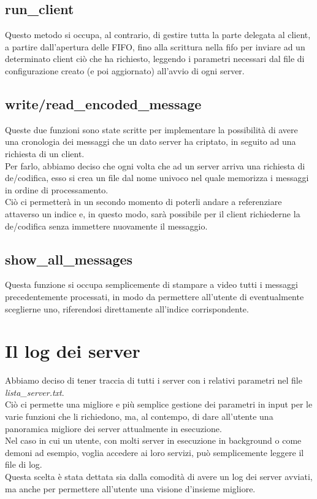 \documentclass[a4paper,9pt]{article}
\begin{document}
\subsection{run\_client}
Questo metodo si occupa, al contrario, di gestire tutta la parte delegata al client, a partire dall'apertura delle FIFO, fino alla scrittura nella fifo per inviare ad un determinato client ciò che ha richiesto, leggendo i parametri necessari dal file di configurazione creato (e poi aggiornato) all'avvio di ogni server.
\subsection{write/read\_encoded\_message}
Queste due funzioni sono state scritte per implementare la possibilità di avere una cronologia dei messaggi che un dato server ha criptato, in seguito ad una richiesta di un client.\\
Per farlo, abbiamo deciso che ogni volta che ad un server arriva una richiesta di de/codifica, esso si crea un file dal nome univoco nel quale memorizza i messaggi in ordine di processamento.\\
Ciò ci permetterà in un secondo momento di poterli andare a referenziare attaverso un indice e, in questo modo, sarà possibile per il client richiederne la de/codifica senza immettere nuovamente il messaggio.
\subsection{show\_all\_messages}
Questa funzione si occupa semplicemente di stampare a video tutti i messaggi precedentemente processati, in modo da permettere all'utente di eventualmente sceglierne uno, riferendosi direttamente all'indice corrispondente. 

\section{Il log dei server}
Abbiamo deciso di tener traccia di tutti i server con i relativi parametri nel file \emph{lista\_server.txt}.\\ 
Ciò ci permette una migliore e più semplice gestione dei parametri in input per le varie funzioni che li richiedono, ma, al contempo, di dare all'utente una panoramica migliore dei server attualmente in esecuzione.\\
Nel caso in cui un utente, con molti server in esecuzione in background o come demoni ad esempio, voglia accedere ai loro servizi, può semplicemente leggere il file di log.\\
Questa scelta è stata dettata sia dalla comodità di avere un log dei server avviati, ma anche per permettere all'utente una visione d'insieme migliore.
\end{document}
